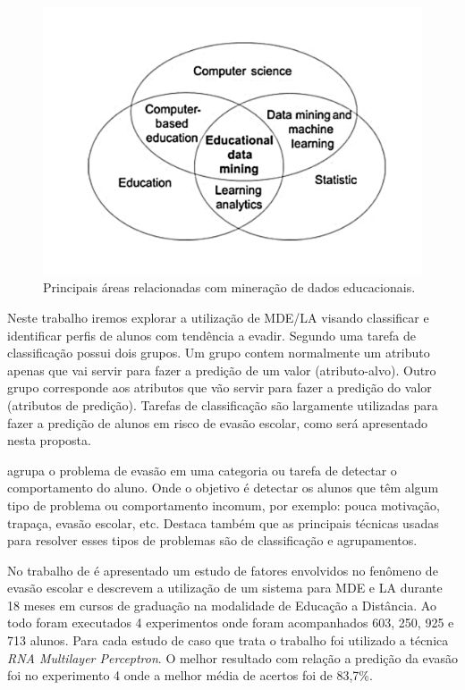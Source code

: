 \documentclass[diss,capa]{texufpel}
\begin{document}
\begin{figure}[htbp]
  \centering \includegraphics[scale=.4]{imagens/areas-edm.pdf}
  \caption{Principais áreas relacionadas com mineração de dados educacionais. \cite{Koedinger2008}}
  \label{fig:areas-relacionadas-mde}
\end{figure}

Neste trabalho iremos explorar a utilização de MDE/LA visando classificar e identificar perfis de alunos com tendência a evadir. Segundo \citet{goldschmidt2015data} uma tarefa de classificação possui dois grupos. Um grupo contem normalmente um atributo apenas que vai servir para fazer a predição de um valor (atributo-alvo). Outro grupo corresponde aos atributos que vão servir para fazer a predição do valor (atributos de predição). Tarefas de classificação são largamente utilizadas para fazer a predição de alunos em risco de evasão escolar, como será apresentado nesta proposta.

\citet{baker2010data} agrupa o problema de evasão em uma categoria ou tarefa de detectar o comportamento do aluno. Onde o objetivo é detectar os alunos que têm algum tipo de problema ou comportamento incomum, por exemplo: pouca motivação, trapaça, evasão escolar, etc. Destaca também que as principais técnicas usadas para resolver esses tipos de problemas são de classificação e agrupamentos.

No trabalho de \citet{rigo2014aplicaccoes} é apresentado um estudo de fatores envolvidos no fenômeno de evasão escolar e descrevem a utilização de um sistema para MDE e LA durante 18 meses em cursos de graduação na modalidade de Educação a Distância. Ao todo foram executados 4 experimentos onde foram acompanhados 603, 250, 925 e 713 alunos. Para cada estudo de caso que trata o trabalho foi utilizado a técnica \textit{RNA Multilayer Perceptron}. O melhor resultado com relação a predição da evasão foi no experimento 4 onde a melhor média de acertos foi de 83,7\%.
\end{document}
